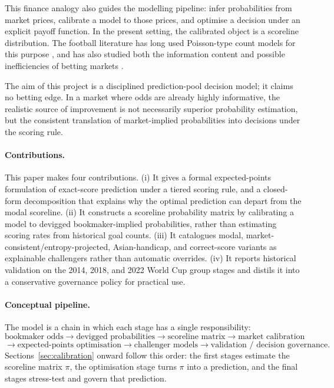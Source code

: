 \documentclass[11pt]{article}
\begin{document}
This finance analogy also guides the modelling pipeline: infer probabilities from market prices, calibrate a model to those prices, and optimise a decision under an explicit payoff function. In the present setting, the calibrated object is a scoreline distribution. The football literature has long used Poisson-type count models for this purpose \cite{maher1982,dixoncoles1997}, and has also studied both the information content and possible inefficiencies of betting markets \cite{dixoncoles1997}.

The aim of this project is a disciplined prediction-pool decision model; it claims no betting edge. In a market where odds are already highly informative, the realistic source of improvement is not necessarily superior probability estimation, but the consistent translation of market-implied probabilities into decisions under the scoring rule.

\paragraph{Contributions.} This paper makes four contributions. (i) It gives a formal
expected-points formulation of exact-score prediction under a tiered scoring rule, and a
closed-form decomposition that explains why the optimal prediction can depart from the modal
scoreline. (ii) It constructs a scoreline probability matrix by calibrating a model to devigged bookmaker-implied probabilities, rather than estimating scoring rates from historical goal counts. (iii) It catalogues modal, market-consistent/entropy-projected, Asian-handicap, and correct-score variants as explainable challengers rather than automatic overrides. (iv) It reports historical validation on the 2014, 2018, and 2022 World Cup group stages and distils it into a conservative governance policy for practical use.

\paragraph{Conceptual pipeline.} The model is a chain in which each stage has a single
responsibility:
\[
\text{bookmaker odds}
\rightarrow
\text{devigged probabilities}
\rightarrow
\text{scoreline matrix}
\rightarrow
\text{market calibration}
\]
\[
\rightarrow
\text{expected-points optimisation}
\rightarrow
\text{challenger models}
\rightarrow
\text{validation / decision governance}.
\]
Sections~\ref{sec:calibration} onward follow this order: the first stages estimate the
scoreline matrix $\pi$, the optimisation stage turns $\pi$ into a prediction, and the final
stages stress-test and govern that prediction.
\end{document}
